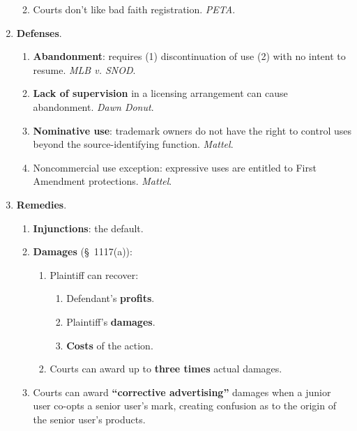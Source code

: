 \begin{enumerate}
\begin{enumerate}
\begin{enumerate}
            \end{enumerate}
        \item Courts don't like bad faith registration. \emph{PETA}.
    \end{enumerate}
    \item \textbf{Defenses}.
    \begin{enumerate}
        \item \textbf{Abandonment}: requires (1) discontinuation of use (2) 
        with no intent to resume. \emph{MLB v. SNOD}.
        \item \textbf{Lack of supervision} in a licensing arrangement can 
        cause abandonment. \emph{Dawn Donut}.
        \item \textbf{Nominative use}: trademark owners do not have the right 
        to control uses beyond the source-identifying function. \emph{Mattel}.
        \item Noncommercial use exception: expressive uses are entitled to 
        First Amendment protections. \emph{Mattel}.
    \end{enumerate}
    \item \textbf{Remedies}.
    \begin{enumerate}
        \item \textbf{Injunctions}: the default.
        \item \textbf{Damages} (\S\ 1117(a)):
        \begin{enumerate}
            \item Plaintiff can recover:
            \begin{enumerate}
                \item Defendant's \textbf{profits}.
                \item Plaintiff's \textbf{damages}.
                \item \textbf{Costs} of the action.
            \end{enumerate}
            \item Courts can award up to \textbf{three times} actual damages.
        \end{enumerate}
        \item Courts can award \textbf{``corrective advertising''} damages 
        when a junior user co-opts a senior user's mark, creating confusion as 
        to the origin of the senior user's products.
    \end{enumerate}
\end{enumerate}

\newpage

